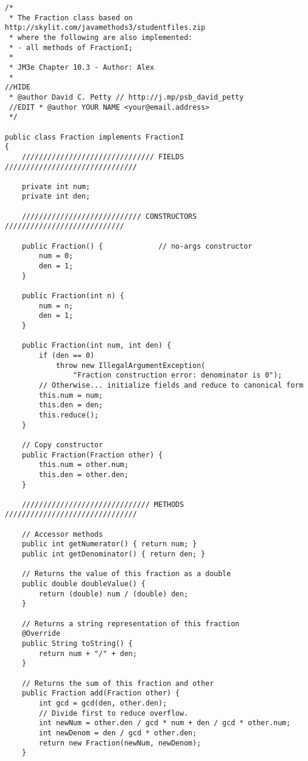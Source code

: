 \documentclass[11pt]{article}%
\begin{document}
\begin{lstlisting}[caption=\code{Fraction.java},label=Fraction]
/*
 * The Fraction class based on http://skylit.com/javamethods3/studentfiles.zip
 * where the following are also implemented:
 * - all methods of FractionI;
 *
 * JM3e Chapter 10.3 - Author: Alex
 *
//HIDE
 * @author David C. Petty // http://j.mp/psb_david_petty
 //EDIT * @author YOUR NAME <your@email.address>
 */

public class Fraction implements FractionI
{
    /////////////////////////////// FIELDS ///////////////////////////////

    private int num;
    private int den;

    //////////////////////////// CONSTRUCTORS ////////////////////////////

    public Fraction() {             // no-args constructor
        num = 0;
        den = 1;
    }

    public Fraction(int n) {
        num = n;
        den = 1;
    }

    public Fraction(int num, int den) {
        if (den == 0)
            throw new IllegalArgumentException(
                "Fraction construction error: denominator is 0");
        // Otherwise... initialize fields and reduce to canonical form
        this.num = num;
        this.den = den;
        this.reduce();
    }

    // Copy constructor
    public Fraction(Fraction other) {        
        this.num = other.num;
        this.den = other.den;
    }

    ////////////////////////////// METHODS ///////////////////////////////

    // Accessor methods
    public int getNumerator() { return num; }
    public int getDenominator() { return den; }

    // Returns the value of this fraction as a double
    public double doubleValue() {
        return (double) num / (double) den;
    }

    // Returns a string representation of this fraction
    @Override
    public String toString() {
        return num + "/" + den;
    }

    // Returns the sum of this fraction and other
    public Fraction add(Fraction other) {
        int gcd = gcd(den, other.den);
        // Divide first to reduce overflow.
        int newNum = other.den / gcd * num + den / gcd * other.num;
        int newDenom = den / gcd * other.den;
        return new Fraction(newNum, newDenom);
    }


\end{lstlisting}
\end{document}
